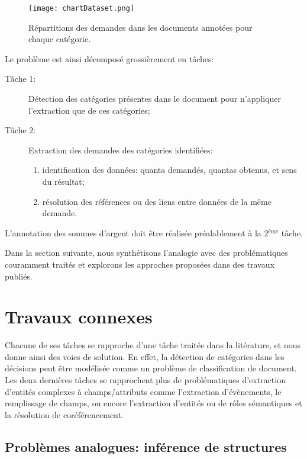 \begin{figure}[h!]
\texttt{[image: chartDataset.png]}
\caption{Répartitions des demandes dans les documents annotées pour chaque catégorie.}\label{fig:quanta:hist-repartition-docs}
\end{figure}

Le problème est ainsi décomposé grossièrement en tâches:
\begin{description}
\item[Tâche 1:] Détection des catégories présentes dans le document pour n'appliquer l'extraction  que de ces catégories;
\item[Tâche 2:] Extraction des demandes des catégories identifiées:
\begin{enumerate}
	\item identification des données: quanta demandés, quantas obtenus, et sens du résultat;
	\item résolution des références ou des liens entre données de la même demande.
\end{enumerate}
\end{description}

L'annotation des sommes d'argent doit être réalisée préalablement à la 2$^\text{ème}$ tâche.

 Dans la section suivante, nous synthétisons l'analogie avec des problématiques couramment traités et explorons les approches proposées dans des travaux publiés.

\section{Travaux connexes}
\label{sec:quanta:biblio}
Chacune de ses tâches se rapproche d'une tâche traitée dans la litérature, et nous donne ainsi des voies de solution. En effet, la détection de catégories dans les décisions peut être modélisée comme un problème de classification de document. Les deux dernières tâches se rapprochent plus de problématiques d'extraction d'entités complexes à champs/attributs comme l'extraction d'évènements, le remplissage de champs, ou encore l'extraction d'entités ou de rôles sémantiques et la résolution de coréférencement.

\subsection{Problèmes analogues: inférence de structures}%

